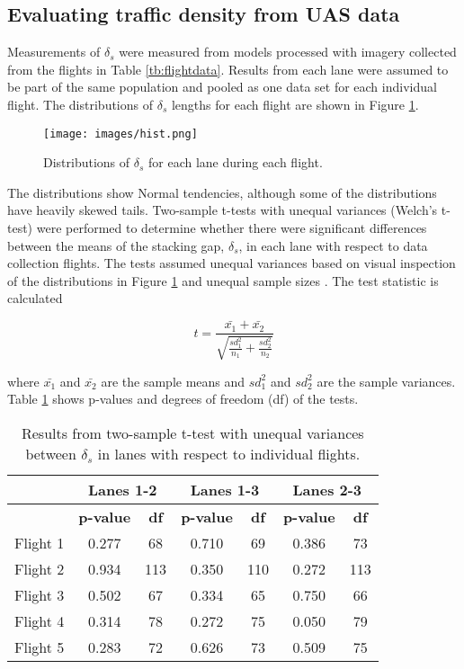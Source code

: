 \documentclass[preprint,12pt,a4paper]{elsarticle}
\begin{document}
\begin{linenumbers}
\subsection{Evaluating traffic density from UAS data}

Measurements of $\delta_{s}$ were measured from models processed with imagery collected from the flights in Table \ref{tb:flightdata}.  Results from each lane were assumed to be part of the same population and pooled as one data set for each individual flight. The distributions of  $\delta_{s}$ lengths for each flight are shown in Figure \ref{fig:hist}.

\begin{figure}[H]
\centering
\texttt{[image: images/hist.png]} 
\caption{Distributions of $\delta_{s}$ for each lane during each flight.}
\label{fig:hist}
\end{figure}

The distributions show Normal tendencies, although some of the distributions have heavily skewed tails. Two-sample t-tests with unequal variances (Welch's t-test) were performed to determine whether there were significant differences between the means of the stacking gap, $\delta_{s}$, in each lane with respect to data collection flights. The tests assumed unequal variances based on visual inspection of the distributions in Figure \ref{fig:hist} and unequal sample sizes \citep{Rasch2011, Derrick2016}. The test statistic is calculated 

\begin{equation}
t = \frac{\bar{x_{1}}+\bar{x_{2}}}{\sqrt{\frac{sd^{2}_{1}}{n_{1}} + \frac{sd^{2}_{2}}{n_{2}} }}
\end{equation}

\noindent
where $\bar{x_{1}}$ and $\bar{x_{2}}$ are the sample means and  $sd^{2}_{1}$ and $sd^{2}_{2}$ are the sample variances. Table \ref{tab:ttest-lanes} shows p-values and degrees of freedom (df) of the tests.

\begin{table}[H]
\centering
\caption{Results from two-sample t-test with unequal variances between $\delta_{s}$ in lanes with respect to individual flights.}
\label{tab:ttest-lanes}
\begin{tabular}{@{}ccc|cc|cc@{}}
\toprule
 & \multicolumn{2}{c}{\textbf{Lanes 1-2}} & \multicolumn{2}{c}{\textbf{Lanes 1-3}} & \multicolumn{2}{c}{\textbf{Lanes 2-3}} \\ \midrule
 & \textbf{p-value} & \textbf{df} & \textbf{p-value} & \textbf{df} & \textbf{p-value} & \textbf{df} \\
Flight 1 & 0.277 & 68 & 0.710 & 69 & 0.386 & 73 \\
Flight 2 & 0.934 & 113 & 0.350 & 110 & 0.272 & 113 \\
Flight 3 & 0.502 & 67 & 0.334 & 65 & 0.750 & 66 \\
Flight 4 & 0.314 & 78 & 0.272 & 75 & 0.050 & 79 \\
Flight 5 & 0.283 & 72 & 0.626 & 73 & 0.509 & 75 \\ \bottomrule
\end{tabular}
\end{table}


\end{linenumbers}
\end{document}
